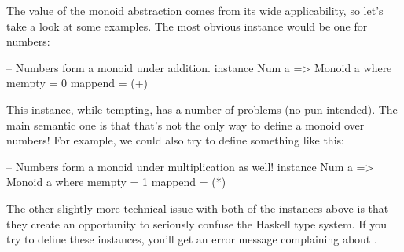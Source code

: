 The value of the monoid abstraction comes from its wide applicability, so let's take a look at some
examples. The most obvious instance would be one for numbers:
\begin{haskell}
-- Numbers form a monoid under addition.
instance Num a => Monoid a where
  mempty = 0
  mappend = (+)
\end{haskell}

This instance, while tempting, has a number of problems (no pun intended). The main semantic one is
that that's not the only way to define a monoid over numbers! For example, we could also try to
define something like this:
\begin{haskell}
-- Numbers form a monoid under multiplication as well!
instance Num a => Monoid a where
  mempty = 1
  mappend = (*)
\end{haskell}
The other slightly more technical issue with both of the instances above is that they create an
opportunity to seriously confuse the Haskell type system. If you try to define these instances,
you'll get an error message complaining about .
